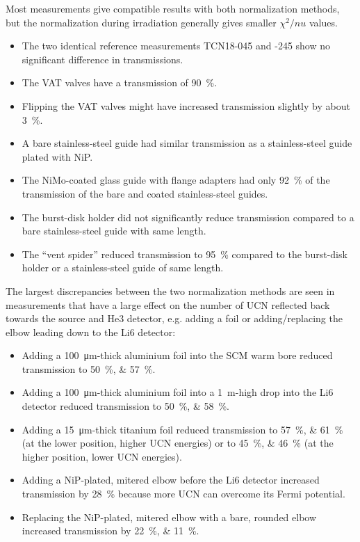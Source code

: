 \documentclass[10pt,letterpaper]{article}
\begin{document}
Most measurements give compatible results with both normalization methods, but the normalization during irradiation generally gives smaller $\chi^2/nu$ values.
\begin{itemize}
\item The two identical reference measurements TCN18-045 and -245 show no significant difference in transmissions.
\item The VAT valves have a transmission of \SI{90}{\percent}.
\item Flipping the VAT valves might have increased transmission slightly by about \SI{3}{\percent}.
\item A bare stainless-steel guide had similar transmission as a stainless-steel guide plated with NiP.
\item The NiMo-coated glass guide with flange adapters had only \SI{92}{\percent} of the transmission of the bare and coated stainless-steel guides.
\item The burst-disk holder did not significantly reduce transmission compared to a bare stainless-steel guide with same length.
\item The ``vent spider'' reduced transmission to \SI{95}{\percent} compared to the burst-disk holder or a stainless-steel guide of same length.
\end{itemize}
The largest discrepancies between the two normalization methods are seen in measurements that have a large effect on the number of UCN reflected back towards the source and He3 detector, e.g. adding a foil or adding/replacing the elbow leading down to the Li6 detector:
\begin{itemize}
\item Adding a \SI{100}{\micro\meter}-thick aluminium foil into the SCM warm bore reduced transmission to \SIlist{50;57}{\percent}.
\item Adding a \SI{100}{\micro\meter}-thick aluminium foil into a \SI{1}{\meter}-high drop into the Li6 detector reduced transmission to \SIlist{50;58}{\percent}.
\item Adding a \SI{15}{\micro\meter}-thick titanium foil reduced transmission to \SIlist{57;61}{\percent} (at the lower position, higher UCN energies) or to \SIlist{45;46}{\percent} (at the higher position, lower UCN energies).
\item Adding a NiP-plated, mitered elbow before the Li6 detector increased transmission by \SI{28}{\percent} because more UCN can overcome its Fermi potential.
\item Replacing the NiP-plated, mitered elbow with a bare, rounded elbow increased transmission by \SIlist{22;11}{\percent}.
\end{itemize}
\end{document}
